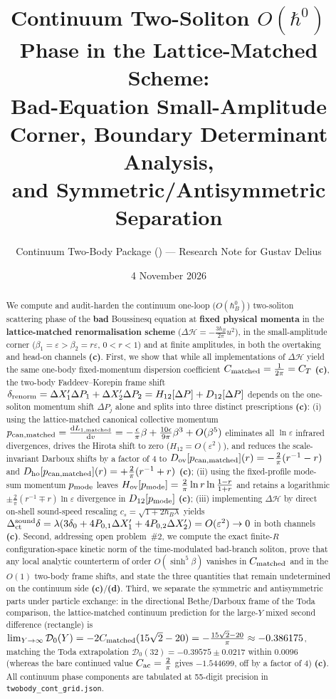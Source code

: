 \documentclass[11pt,a4paper]{article}
\title{\textbf{Continuum Two-Soliton $O(\hbar^0)$ Phase in the Lattice-Matched Scheme:\\
Bad-Equation Small-Amplitude Corner, Boundary Determinant Analysis,\\
and Symmetric/Antisymmetric Separation}}
\author{Continuum Two-Body Package (\script{twobody\_cont}) --- Research Note for Gustav Delius}
\date{4 November 2026}
\newcommand{\Lc}{\textbf{(c)}}
\newcommand{\Ld}{\textbf{(d)}}
\newcommand{\script}[1]{\texttt{#1}}
\newcommand{\dd}{\mathrm{d}}
\begin{document}
\maketitle

\begin{abstract}
We compute and audit-harden the continuum one-loop ($O(\hbar_B^0)$) two-soliton scattering phase of the \textbf{bad} Boussinesq equation at \textbf{fixed physical momenta} in the \textbf{lattice-matched renormalisation scheme} ($\Delta\mathcal{H}=-\frac{3\hbar_B}{2\pi}u^2$), in the small-amplitude corner ($\beta_1=\varepsilon>\beta_2=r\varepsilon$, $0<r<1$) and at finite amplitudes, in both the overtaking and head-on channels \Lc. First, we show that while all implementations of $\Delta\mathcal{H}$ yield the same one-body fixed-momentum dispersion coefficient $C_{\rm matched}=\frac{1}{2\pi}=C_T$ \Lc, the two-body Faddeev--Korepin frame shift $\delta_{\rm renorm}=\Delta X_1'\Delta P_1+\Delta X_2'\Delta P_2=H_{12}[\Delta P]+D_{12}[\Delta P]$ depends on the one-soliton momentum shift $\Delta P_j$ alone and splits into three distinct prescriptions \Lc: (i) using the lattice-matched canonical collective momentum $p_{\rm can,matched}=\frac{\dd L_{1,\rm matched}}{\dd v}=-\frac{\epsilon}{\pi}\beta+\frac{10\epsilon}{9\pi}\beta^3+O(\beta^5)$ eliminates all $\ln\varepsilon$ infrared divergences, drives the Hirota shift to zero ($H_{12}=O(\varepsilon^2)$), and reduces the scale-invariant Darboux shifts by a factor of $4$ to $D_{\rm ov}[p_{\rm can,matched}](r)=-\frac{2}{\pi}(r^{-1}-r)$ and $D_{\rm ho}[p_{\rm can,matched}](r)=+\frac{2}{\pi}(r^{-1}+r)$ \Lc; (ii) using the fixed-profile mode-sum momentum $p_{\rm mode}$ leaves $H_{\rm ov}[p_{\rm mode}]=\frac{2}{\pi}\ln r\ln\frac{1-r}{1+r}$ and retains a logarithmic $\pm\frac{2}{\pi}(r^{-1}\mp r)\ln\varepsilon$ divergence in $D_{12}[p_{\rm mode}]$ \Lc; (iii) implementing $\Delta\mathcal{H}$ by direct on-shell sound-speed rescaling $c_s=\sqrt{1+2\hbar_B\lambda}$ yields $\Delta_{\rm ct}^{\rm sound}\delta=\lambda(3\delta_0+4P_{0,1}\Delta X_1'+4P_{0,2}\Delta X_2')=O(\varepsilon^2)\to 0$ in both channels \Lc. Second, addressing open problem~\#2, we compute the exact finite-$R$ configuration-space kinetic norm of the time-modulated bad-branch soliton, prove that any local analytic counterterm of order $O(\sinh^5\beta)$ vanishes in $C_{\rm matched}$ and in the $O(1)$ two-body frame shifts, and state the three quantities that remain undetermined on the continuum side \Lc/\Ld. Third, we separate the symmetric and antisymmetric parts under particle exchange: in the directional Bethe/Darboux frame of the Toda comparison, the lattice-matched continuum prediction for the large-$Y$ mixed second difference (rectangle) is $\lim_{Y\to\infty}\mathcal{D}_0(Y)=-2C_{\rm matched}(15\sqrt2-20)=-\frac{15\sqrt2-20}{\pi}\approx -0.386175$, matching the Toda extrapolation $\mathcal{D}_0(32)=-0.39575\pm 0.0217$ within $0.0096$ (whereas the bare continued value $C_{\rm ac}=\frac{2}{\pi}$ gives $-1.544699$, off by a factor of $4$) \Lc. All continuum phase components are tabulated at 55-digit precision in \script{twobody\_cont\_grid.json}.
\end{abstract}
\end{document}
